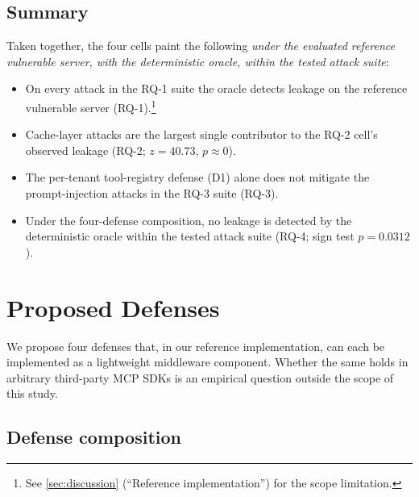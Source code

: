 \documentclass[sigconf, anonymous, natbib=false]{acmart}
\begin{document}
\subsection{Summary}

Taken together, the four cells paint the following
\emph{under the evaluated reference vulnerable server, with
the deterministic oracle, within the tested attack suite}:
\begin{itemize}
  \item On every attack in the RQ-1 suite the oracle detects
        leakage on the reference vulnerable server
        (RQ-1).\footnote{See \cref{sec:discussion}
        (``Reference implementation'') for the scope
        limitation.}
  \item Cache-layer attacks are the largest single
        contributor to the RQ-2 cell's observed leakage
        (RQ-2; $z = 40.73$, $p \approx 0$).
  \item The per-tenant tool-registry defense (D1) alone does
        not mitigate the prompt-injection attacks in the
        RQ-3 suite (RQ-3).
  \item Under the four-defense composition, no leakage is
        detected by the deterministic oracle within the
        tested attack suite (RQ-4; sign test $p = 0.0312$).
\end{itemize}

\section{Proposed Defenses}\label{sec:defenses}

We propose four defenses that, in our reference
implementation, can each be implemented as a lightweight
middleware component. Whether the same holds in arbitrary
third-party MCP SDKs is an empirical question outside the
scope of this study.

\subsection{Defense composition}
\end{document}
